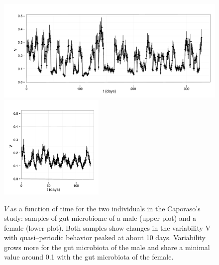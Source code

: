 \begin{figure}
	\includegraphics[width=1.0\textwidth]{results/sliwin/male_mov.pdf}
	\hspace*{3mm}\includegraphics[width=0.448\textwidth]{results/sliwin/female_mov.pdf}
\caption{$V$ as a function of time for the two individuals in the Caporaso's study\cite{moving}: samples of gut microbiome of a male (upper plot) and a female (lower plot). Both samples show changes in the variability V with quasi--periodic behavior peaked at about 10 days. Variability grows more for the gut microbiota of the male and share a minimal value around 0.1 with the gut microbiota of the female.}
\label{fig:tempevo1}
\end{figure}

